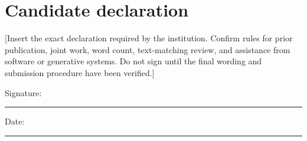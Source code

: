 \chapter*{Candidate declaration}

[Insert the exact declaration required by the institution. Confirm rules for
prior publication, joint work, word count, text-matching review, and assistance
from software or generative systems. Do not sign until the final wording and
submission procedure have been verified.]

\vspace{18mm}
\noindent Signature: \rule{55mm}{0.4pt}\hfill Date: \rule{35mm}{0.4pt}
